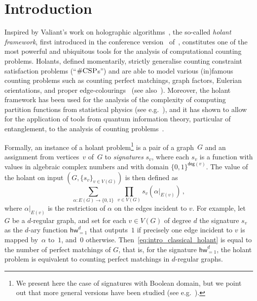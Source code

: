 \documentclass[authorcolumns,numberwithinsect]{no-lipics-v2022}
\begin{document}
\newpage

\section{Introduction}
Inspired by Valiant's work on holographic algorithms~\cite{Valiant08}, the so-called \emph{holant framework}, first introduced in the conference version~\cite{CaiLX09} of~\cite{CaiLX14}, constitutes one of the most powerful and ubiquitous tools for the analysis of computational counting problems. Holants, defined momentarily, strictly generalise counting constraint satisfaction problems (``$\#\textsc{CSP}$s'') and are able to model various (in)famous counting problems such as counting perfect matchings, graph factors, Eulerian orientations, and proper edge-colourings~\cite{CaiG21} (see also~\cite{CaiL11}). Moreover, the holant framework has been used for the analysis of the complexity of computing partition functions from statistical physics (see e.g.\ \cite{CaiFX18,CaiF23}), and it has shown to allow for the application of tools from quantum information theory, particular of entanglement, to the analysis of counting problems~\cite{Backens18}.

Formally, an instance of a holant problem\footnote{We present here the case of signatures with Boolean domain, but we point out that more general versions have been studied (see e.g.\ \cite{CaiG21}).} is a pair of a graph~$G$ and an assignment from vertices~$v$ of~$G$ to \emph{signatures} $s_v$, where each $s_v$ is a function with values in algebraic complex numbers and with domain $\{0,1\}^{\mathsf{deg}(v)}$. The value of the holant on input $(G,\{s_v\}_{v\in V(G)})$ is then defined as
\begin{equation}\label{eq:intro_classical_holant}
    \sum_{\alpha: E(G) \to \{0,1\}}~ \prod_{v\in V(G)} s_v(\alpha|_{E(v)}) \,,
\end{equation}
where $\alpha|_{E(v)}$ is the restriction of $\alpha$ on the edges incident to $v$. For example, let $G$ be a $d$-regular graph, and set
for each $v\in V(G)$ of degree $d$ the signature $s_v$ as the $d$-ary function $\mathsf{hw}^d_{=1}$ that outputs~$1$ if precisely one edge incident to $v$ is mapped by~$\alpha$ to~$1$, and~$0$ otherwise. Then~\eqref{eq:intro_classical_holant} is equal to the number of perfect matchings of $G$, that is, for the signature $\mathsf{hw}^d_{=1}$, the holant problem is equivalent to counting perfect matchings in $d$-regular graphs.
\end{document}
